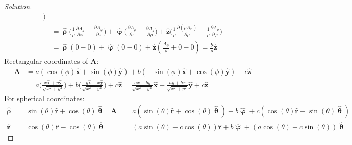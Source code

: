 \documentclass[crop=false,class=article,oneside]{standalone}
\begin{document}
\begin{proof}[Solution]
\begin{align*}
                \bigg)\\
                &=\hat{\boldsymbol{\uprho}}\bigg(
                    \frac{1}{\rho}
                    \frac{\partial{A_{z}}}{\partial\varphi}
                    -\frac{\partial{A_{\varphi}}}
                          {\partial{z}}
                \bigg)
                +\hat{\boldsymbol{\upvarphi}}\bigg(
                    \frac{\partial{A_{\rho}}}{\partial{z}}
                    -\frac{\partial{A_{z}}}{\partial\rho}
                \bigg)
                +\hat{\mathbf{z}}\bigg(
                    \frac{1}{\rho}
                    \frac{\partial(\rho{A_{\varphi}})}
                         {\partial\rho}
                    -\frac{1}{\rho}
                    \frac{\partial{A_{\rho}}}
                         {\partial\varphi}
                \bigg)\\
                &=\hat{\boldsymbol{\uprho}}(0-0)
                 +\hat{\boldsymbol{\upvarphi}}(0-0)
                 +\hat{\mathbf{z}}(\frac{A_{\phi}}{\rho}+0-0)
                 =\frac{b}{\rho}\hat{\mathbf{z}}
            \end{align*}
            Rectangular coordinates of $\mathbf{A}$:
            \begin{align*}
                \mathbf{A}
                &=a(\cos(\phi)\hat{\mathbf{x}}
                +\sin(\phi)\hat{\mathbf{y}})
                +b(-\sin(\phi)\hat{\mathbf{x}}
                +\cos(\phi)\hat{\mathbf{y}})
                +c\hat{\mathbf{z}}\\
                &=a\bigg(
                    \frac{x\hat{\mathbf{x}}
                    +y\hat{\mathbf{y}}}{\sqrt{x^{2}+y^{2}}}
                \bigg)
                +b\bigg(
                    \frac{-y\hat{\mathbf{x}}
                    +x\hat{\mathbf{y}}}{\sqrt{x^{2}+y^{2}}}
                \bigg)
                +c\hat{\mathbf{z}}
                =\frac{ax-by}{\sqrt{x^{2}+y^{2}}}\hat{\mathbf{x}}
                +\frac{ay+bx}{\sqrt{x^{2}+y^{2}}}\hat{\mathbf{y}}
                +c\hat{\mathbf{z}}
            \end{align*}
            For spherical coordinates:
            \begin{align*}
                \hat{\boldsymbol{\uprho}}
                &=\sin(\theta)\hat{\mathbf{r}}
                +\cos(\theta)\hat{\boldsymbol{\uptheta}}
                &\mathbf{A}
                &=a(\sin(\theta)\hat{\mathbf{r}}
                +\cos(\theta)\hat{\boldsymbol{\uptheta}})
                +b\hat{\boldsymbol{\upvarphi}}
                +c(\cos(\theta)\hat{\mathbf{r}}
                -\sin(\theta)\hat{\boldsymbol{\uptheta}})\\
                \hat{\mathbf{z}}
                &=\cos(\theta)\hat{\mathbf{r}}
                -\cos(\theta)\hat{\boldsymbol{\uptheta}}
                &
                &=(a\sin(\theta)
                +c\cos(\theta))\hat{\mathbf{r}}
                +b\hat{\boldsymbol{\upvarphi}}
                +(a\cos(\theta)-c\sin(\theta))
                \hat{\boldsymbol{\uptheta}}
            \end{align*}
        \end{proof}
\end{document}
